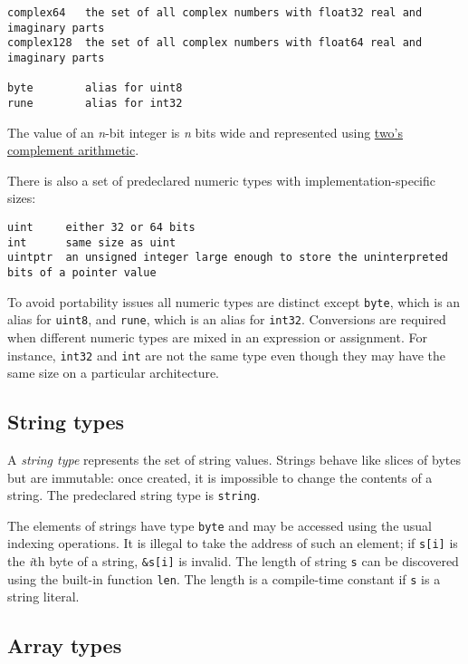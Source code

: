 {\begin{Verbatim}[frame=single]
complex64   the set of all complex numbers with float32 real and imaginary parts
complex128  the set of all complex numbers with float64 real and imaginary parts

byte        alias for uint8
rune        alias for int32
\end{Verbatim}

The value of an \emph{n}-bit integer is \emph{n} bits wide and
represented using
\href{http://en.wikipedia.org/wiki/Two's\_complement}{two's complement
arithmetic}.

There is also a set of predeclared numeric types with
implementation-specific sizes:

\begin{Verbatim}[frame=single]
uint     either 32 or 64 bits
int      same size as uint
uintptr  an unsigned integer large enough to store the uninterpreted bits of a pointer value
\end{Verbatim}

To avoid portability issues all numeric types are distinct except
\texttt{byte}, which is an alias for \texttt{uint8}, and \texttt{rune},
which is an alias for \texttt{int32}. Conversions are required when
different numeric types are mixed in an expression or assignment. For
instance, \texttt{int32} and \texttt{int} are not the same type even
though they may have the same size on a particular architecture.

\subsection*{String types}

A \emph{string type} represents the set of string values. Strings behave
like slices of bytes but are immutable: once created, it is impossible
to change the contents of a string. The predeclared string type is
\texttt{string}.

The elements of strings have type \texttt{byte} and may be accessed
using the usual indexing operations. It is illegal
to take the address of such an element; if \texttt{s{[}i{]}} is the
\emph{i}th byte of a string, \texttt{\&s{[}i{]}} is invalid. The length
of string \texttt{s} can be discovered using the built-in function
\texttt{len}. The length is a compile-time constant if \texttt{s} is a
string literal.

\subsection*{Array types}

}
